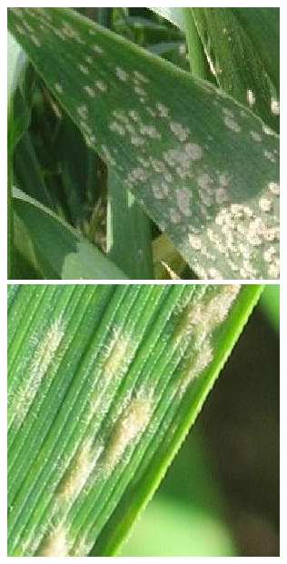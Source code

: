 \begin{figure}[H]
{\begin{minipage}[t]{.2\textwidth}
          \includegraphics[width=\textwidth]{resource/third/powdery(2).jpg} \
          \includegraphics[width=\textwidth]{resource/third/powdery(3).jpg} 
        \end{minipage}
}
\end{figure}
